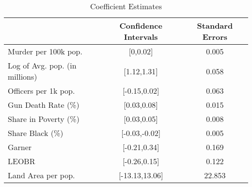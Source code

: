 \begin{table}[ht]
\centering
\caption{Coefficient Estimates} \label{table:bootstrap_coefficients}
\begin{tabular}{lcc}
\hline \hline
& Confidence Intervals & Standard Errors \\ 
\hline
Murder per 100k pop. &[0,0.02]&0.005\\
Log of Avg. pop. (in millions) &[1.12,1.31]&0.058\\
Officers per 1k pop. &[-0.15,0.02]&0.063\\
Gun Death Rate (\%) &[0.03,0.08]&0.015\\
Share in Poverty (\%) &[0.03,0.05]&0.008\\
Share Black (\%) &[-0.03,-0.02]&0.005\\
Garner &[-0.21,0.34]&0.169\\
LEOBR &[-0.26,0.15]&0.122\\
Land Area per pop. &[-13.13,13.06]&22.853\\
\hline \end{tabular} \end{table}